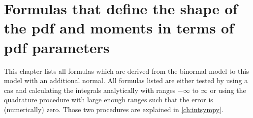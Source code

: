 \chapter{Formulas that define the shape of the pdf and moments in terms of pdf parameters}
\label{ch:formulas}

This chapter lists all formulas which are derived from the binormal model to this model with an additional normal.
All formulas listed are either tested by using a \gls{cas}
and calculating the integrals analytically with ranges $-\infty$ to $\infty$ or
using the quadrature procedure with large enough ranges such that the error is (numerically) zero.
Those two procedures are explained in \cref{ch:intsympy}.













